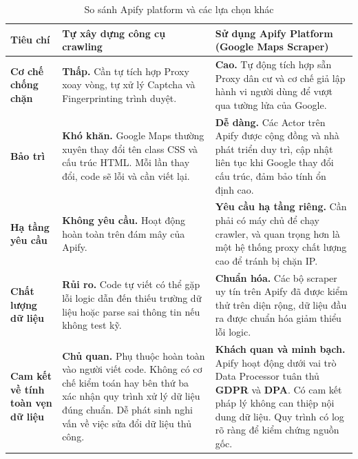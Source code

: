 \clearpage
\begin{landscape}
\begin{table}[h!]
\centering
\setlength{\tabcolsep}{4pt}
\footnotesize
\begin{tabularx}{\linewidth}{|l|X|X|}
\hline
\textbf{Tiêu chí} & \textbf{Tự xây dựng công cụ crawling} & \textbf{Sử dụng Apify Platform (Google Maps Scraper)} \\
\hline
\textbf{Cơ chế chống chặn} & \textbf{Thấp.} Cần tự tích hợp Proxy xoay vòng, tự xử lý Captcha và Fingerprinting trình duyệt. & \textbf{Cao.} Tự động tích hợp sẵn Proxy dân cư và cơ chế giả lập hành vi người dùng để vượt qua tường lửa của Google. \\
\hline
\textbf{Bảo trì} & \textbf{Khó khăn.} Google Maps thường xuyên thay đổi tên class CSS và cấu trúc HTML. Mỗi lần thay đổi, code sẽ lỗi và cần viết lại. & \textbf{Dễ dàng.} Các Actor trên Apify được cộng đồng và nhà phát triển duy trì, cập nhật liên tục khi Google thay đổi cấu trúc, đảm bảo tính ổn định cao. \\
\hline
\textbf{Hạ tầng yêu cầu} & \textbf{Không yêu cầu.} Hoạt động hoàn toàn trên đám mây của Apify. & \textbf{Yêu cầu hạ tầng riêng.} Cần phải có máy chủ để chạy crawler, và quan trọng hơn là một hệ thống proxy chất lượng cao để tránh bị chặn IP. \\
\hline
\textbf{Chất lượng dữ liệu} & \textbf{Rủi ro.} Code tự viết có thể gặp lỗi logic dẫn đến thiếu trường dữ liệu hoặc parse sai thông tin nếu không test kỹ.& \textbf{Chuẩn hóa.} Các bộ scraper uy tín trên Apify đã được kiểm thử trên diện rộng, dữ liệu đầu ra được chuẩn hóa giảm thiểu lỗi logic. \\
\hline
\textbf{Cam kết về tính toàn vẹn dữ liệu} & \textbf{Chủ quan.} Phụ thuộc hoàn toàn vào người viết code. Không có cơ chế kiểm toán hay bên thứ ba xác nhận quy trình xử lý dữ liệu đúng chuẩn. Dễ phát sinh nghi vấn về việc sửa đổi dữ liệu thủ công. & \textbf{Khách quan và minh bạch.} Apify hoạt động dưới vai trò Data Processor tuân thủ \textbf{GDPR} và \textbf{DPA}. Có cam kết pháp lý không can thiệp nội dung dữ liệu. Quy trình có log rõ ràng để kiểm chứng nguồn gốc. \\
\hline
\end{tabularx}
\caption{So sánh Apify platform và các lựa chọn khác}
\end{table}
\end{landscape}

